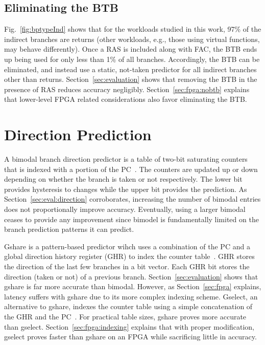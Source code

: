 
\subsection{Eliminating the BTB}
\label{sec:arch:nobtb}
Fig.~\ref{fig:bptypeInd} shows that for the workloads studied in this work, 97\% of the indirect branches are returns (other workloads, e.g., those using virtual functions, may behave differently). Once a RAS is included along with FAC, the BTB ends up being used for only less than 1\% of all branches. Accordingly, the BTB can be eliminated, and instead use a static, not-taken predictor for all indirect branches other than returns. Section~\ref{sec:evaluation} shows that removing the BTB in the presence of RAS reduces accuracy negligibly. Section~\ref{sec:fpga:nobtb} explains that lower-level FPGA related considerations also favor eliminating the BTB.

\section{Direction Prediction}
\label{sec:arch:direction}

A bimodal branch direction predictor is a table of two-bit saturating counters that is indexed with a portion of the PC~\cite{bimodal}. The counters are updated up or down depending on whether the branch is taken or not respectively. The lower bit provides hysteresis to changes while the upper bit provides the prediction. As Section~\ref{sec:eval:direction} corroborates, increasing the number of bimodal entries does not proportionally improve accuracy. Eventually, using a larger bimodal ceases to provide any improvement since bimodel is fundamentally limited on the branch prediction patterns it can predict.

Gshare is a pattern-based predictor wihch uses a combination of the PC and a global direction history register (GHR) to index the counter table~\cite{McFarling}. GHR stores the direction of the last few branches in a bit vector. Each GHR bit stores the direction (taken or not) of a previous branch.  Section~\ref{sec:evaluation} shows that gshare is far more accurate than bimodal. However, as Section~\ref{sec:fpga} explains, latency suffers with gshare due to its more complex indexing scheme. Gselect, an alternative to gshare, indexes the counter table using a simple concatenation of the GHR and the PC~\cite{McFarling}. For practical table sizes, gshare proves more accurate than gselect. Section~\ref{sec:fpga:indexing} explains that with proper modification, gselect proves faster than gshare on an FPGA while sacrificing little in accuracy.

